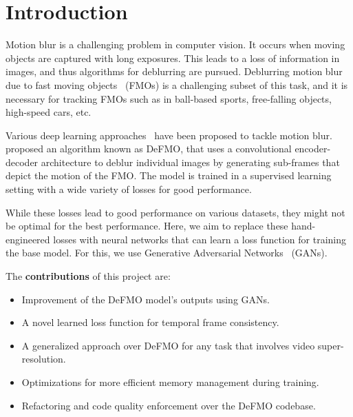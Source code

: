 \section{Introduction}

Motion blur is a challenging problem in computer vision.
It occurs when moving objects are captured with long exposures.
This leads to a loss of information in images, and thus algorithms for deblurring are pursued.
Deblurring motion blur due to fast moving objects~\citep{fmo} (FMOs) is a challenging subset of this task, and it is necessary for tracking FMOs such as in ball-based sports, free-falling objects, high-speed cars, etc.

Various deep learning approaches~\citep{deblurgan-v2,deblur-real-blur,deblur-deep-prior,dynamic-scene-deblur,phase-only-kernel,vid-from-single-img} have been proposed to tackle motion blur.
\citet{defmo} proposed an algorithm known as DeFMO, that uses a convolutional encoder-decoder architecture to deblur individual images by generating sub-frames that depict the motion of the FMO.\@
The model is trained in a supervised learning setting with a wide variety of losses for good performance.

While these losses lead to good performance on various datasets, they might not be optimal for the best performance.
Here, we aim to replace these hand-engineered losses with neural networks that can learn a loss function for training the base model.
For this, we use Generative Adversarial Networks~\citep{gan} (GANs).

The \textbf{contributions} of this project are:
\begin{itemize}
    \item Improvement of the DeFMO model's outputs using GANs.
    \item A novel learned loss function for temporal frame consistency.
    \item A generalized approach over DeFMO for any task that involves video super-resolution.
    \item Optimizations for more efficient memory management during training.
    \item Refactoring and code quality enforcement over the DeFMO codebase.
\end{itemize}
